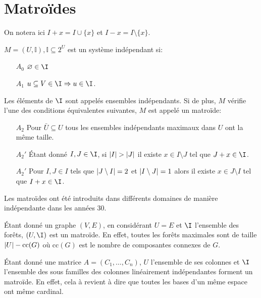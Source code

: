 \documentclass[math, info]{cours}
\begin{document}
\section{Matroïdes}
On notera ici $I + x = I\cup \{x\}$ et $I - x = I \setminus \{x\}$.

\begin{definition}
	$M = \left(U, \mathbb{I} \right), \mathbb{I} \subseteq 2^{U}$ est un système indépendant si:
	\begin{itemize}
		\item[$A_{0}$] $\emptyset \in \I$
		\item[$A_{1}$] $u \subseteq V \in \I \Rightarrow u \in \I$.
	\end{itemize}
	Les éléments de $\I$ sont appelés ensembles indépendants.
	Si de plus, $M$ vérifie l'une des conditions équivalentes suivantes, $M$ est appelé un matroïde:
	\begin{itemize}
		\item[$A_{2}$] Pour $\bar{U} \subseteq U$ tous les ensembles indépendants maximaux dans $U$ ont la même taille.
		\item[$A_{2}'$] Étant donné $I, J \in \I$, si $\left|I\right| > \left|J\right|$ il existe $x \in I \setminus J$ tel que $J + x \in \I$.
		\item[$A_{2}'$] Pour $I, J \in I$ tels que $\left|J\setminus I\right| = 2$ et $\left|I\setminus J\right| = 1$ alors il existe $x \in J \setminus I$ tel que $I + x\in \I$.
	\end{itemize}
\end{definition}
Les matroïdes ont été introduits dans différents domaines de manière indépendante dans les années 30.

\begin{exemple}
	Étant donné un graphe $(V, E)$, en considérant $U = E$ et $\I$ l'ensemble des forêts, $\left(U, \I\right)$ est un matroïde.
	En effet, toutes les forêts maximales sont de taille $\left|U\right| - \mathrm{cc}(G)$ où $\mathrm{cc}(G)$ est le nombre de composantes connexes de $G$.
\end{exemple}

\begin{exemple}
	Étant donné une matrice $A = \left(C_{1}, \ldots, C_{n}\right)$, $U$ l'ensemble de ses colonnes et $\I$ l'ensemble des sous familles des colonnes linéairement indépendantes forment un matroïde.
	En effet, cela à revient à dire que toutes les bases d'un même espace ont même cardinal.
\end{exemple}
\end{document}
